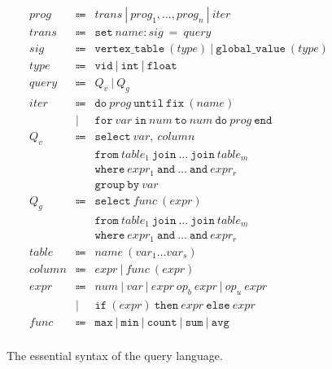 \documentclass{sokendai_thesis} %
\newcommand{\hsp}[1]{\hspace{-3em}\hbox{#1}}
\begin{document}
\begin{figure}[t]
\normalsize
\[
\begin{array}{lclr}
\mathit{prog} & \Coloneqq & \mathit{trans}~|~\mathit{prog_1},\ldots,\mathit{prog_n}~|~\mathit{iter} \\
\mathit{trans} & \Coloneqq & \mathtt{set}~\mathit{name}:\mathit{sig}~=~\mathit{query} \\
\mathit{sig} & \Coloneqq & \mathtt{vertex\_table}~(\mathit{type})~|~\mathtt{global\_value}~(\mathit{type}) \\
\mathit{type} & \Coloneqq & \mathtt{vid}~|~\mathtt{int}~|~\mathtt{float} \\
\mathit{query} & \Coloneqq & \mathit{Q_v}~|~\mathit{Q_g} \\
\mathit{iter} & \Coloneqq & \mathtt{do}~\mathit{prog}~\mathtt{until}~\mathtt{fix}~(\mathit{name}) \\
 & | & \mathtt{for}~\mathit{var}~\mathtt{in}~\mathit{num}~\mathtt{to}~\mathit{num}~\mathtt{do}~\mathit{prog}~\mathtt{end} \\
\mathit{Q_{v}}  & \Coloneqq & \mathtt{select}~\mathit{var},~\mathit{column} \\
 & & \mathtt{from}~\mathit{table_1}~\mathtt{join}~\ldots~\mathtt{join}~\mathit{table_m} \\
 & & \mathtt{where}~\mathit{expr_1}~\mathtt{and}~\ldots~\mathtt{and}~\mathit{expr_r} \\
 & & \mathtt{group~by}~\mathit{var} \\
\mathit{Q_{g}}  & \Coloneqq & \mathtt{select}~\mathit{func}~(\mathit{expr}) \\
 & & \mathtt{from}~\mathit{table_1}~\mathtt{join}~\ldots~\mathtt{join}~\mathit{table_m} \\
 & & \mathtt{where}~\mathit{expr_1}~\mathtt{and}~\ldots~\mathtt{and}~\mathit{expr_r} \\
\mathit{table} & \Coloneqq & \mathit{name}~(\mathit{var}_1\ldots\mathit{var}_s) \\
\mathit{column} & \Coloneqq & \mathit{expr}~|~\mathit{func}~(\mathit{expr}) \\
\mathit{expr}  & \Coloneqq & \mathit{num}~|~\mathit{var}~|~\mathit{expr}~\mathit{op_b}~\mathit{expr}~|~\mathit{op_u}~\mathit{expr} \\
 & | & \mathtt{if}~(\mathit{expr})~\mathtt{then}~\mathit{expr}~\mathtt{else}~\mathit{expr} \\
\mathit{func} & \Coloneqq & \mathtt{max}~|~\mathtt{min}~|~\mathtt{count}~|~\mathtt{sum}~|~\mathtt{avg} \\
\end{array}
\]
\vspace{-3ex}
\caption{The essential syntax of the query language.}
\label{fig:palgol-syntax}
\end{figure}
\end{document}
